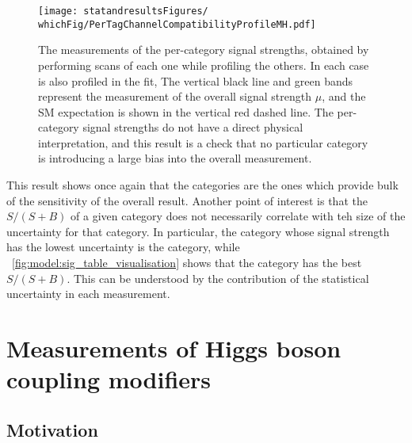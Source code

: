 \begin{figure}[ht!]
\centering
\texttt{[image: statandresultsFigures/\\whichFig/PerTagChannelCompatibilityProfileMH.pdf]} 
\caption{The measurements of the per-category signal strengths, obtained by performing \DNLL scans of each one while profiling the others. In each case \mH is also profiled in the fit, The vertical black line and green bands represent the measurement of the overall signal strength $\mu$, and the SM expectation is shown in the vertical red dashed line. The per-category signal strengths do not have a direct physical interpretation, and this result is a check that no particular category is introducing a large bias into the overall measurement.}

\label{fig:statandresults:mu_per_tag}

\end{figure}

This result shows once again that the \Untagged categories are the ones which provide bulk of the sensitivity of the overall result. Another point of interest is that the $S/(S+B)$ of a given category does not necessarily correlate with teh size of the uncertainty for that category. In particular, the category whose signal strength has the lowest uncertainty is the  category, while \Fig~\ref{fig:model:sig_table_visualisation} shows that the  category has the best $S/(S+B)$. This can be understood by the contribution of the statistical uncertainty in each measurement.

\section{Measurements of Higgs boson coupling modifiers}
\label{sec:statandresults:kappas}
\subsection{Motivation}

